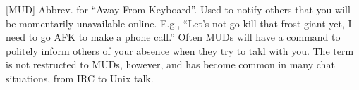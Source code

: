 
[MUD] Abbrev. for ``Away From Keyboard''. Used to notify others that you will be momentarily unavailable online. E.g., ``Let's not go kill
that frost giant yet, I need to go AFK to make a phone call.'' Often MUDs will have a command to politely inform others of your absence when
they try to takl with you. The term is not restructed to MUDs, however, and has become common in many chat situations, from IRC to Unix
talk.

